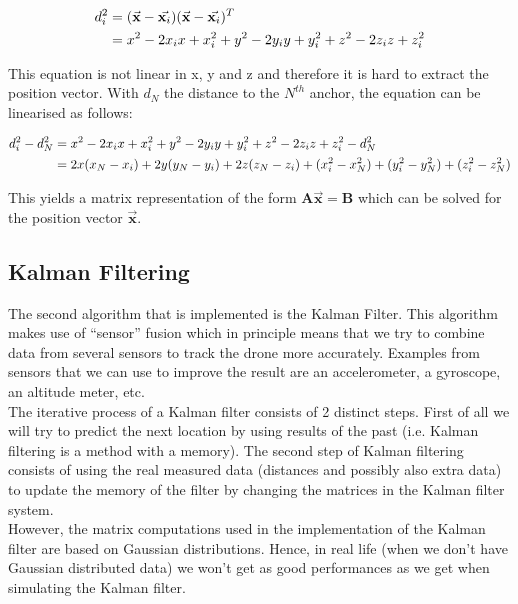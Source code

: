 \documentclass[a4paper]{article}        %
\begin{document}
		\begin{align*}
		\centering
			d_i^2 &= (\vec{\textbf{x}} - \vec{\textbf{x}_i})(\vec{\textbf{x}} - \vec{\textbf{x}_i})^T \\
			&= x^2 - 2x_ix + x_i^2 + y^2 - 2y_iy + y_i^2 + z^2 - 2z_iz + z_i^2
		\end{align*}

		This equation is not linear in x, y and z and therefore it is hard to extract the position vector. With $d_N$ the distance to the $N^{th}$ anchor, the equation can be linearised as follows:

		\begin{align*}
		\centering
			d_i^2 - d_N^2 &= x^2 - 2x_ix + x_i^2 + y^2 - 2y_iy + y_i^2 + z^2 - 2z_iz + z_i^2 - d_N^2 \\
				&= 2x(x_N - x_i) + 2y(y_N - y_i) + 2z(z_N- z_i)+ (x_i^2 - x_N^2) + (y_i^2 - y_N^2)  + (z_i^2 - z_N^2) 
		\end{align*}

		This yields a matrix representation of the form $\textbf{A}\vec{\textbf{x}} = \textbf{B}$ which can be solved for the position vector $\vec{\textbf{x}}$.


	\subsection{Kalman Filtering}
	The second algorithm that is implemented is the Kalman Filter. This algorithm makes use of ``sensor'' fusion which in principle means that we try to combine data from several sensors to track the drone more accurately.
	Examples from sensors that we can use to improve the result are an accelerometer, a gyroscope, an altitude meter, etc.\\
	The iterative process of a Kalman filter consists of 2 distinct steps. First of all we will try to predict the next location by using results of the past (i.e. Kalman filtering is a method with a memory). 
	The second step of Kalman filtering consists of using the real measured data (distances and possibly also extra data) to update the memory of the filter by changing the matrices in the Kalman filter system.\\
	However, the matrix computations used in the implementation of the Kalman filter are based on Gaussian distributions. Hence, in real life (when we don't have Gaussian distributed data) we won't get as good performances as we get when simulating the Kalman filter.
\end{document}
